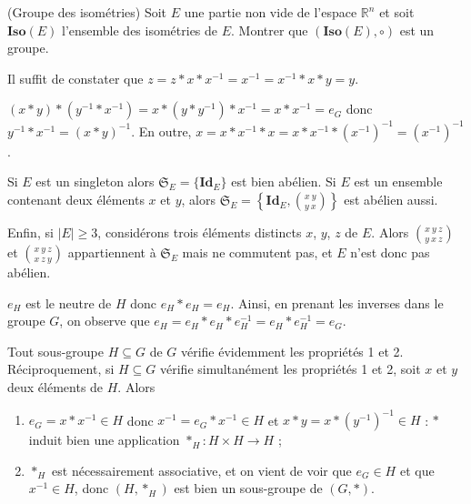 \begin{exo}(Groupe des isométries)
Soit $E$ une partie non vide de l'espace $\mathbb{R}^n$ et soit $\mathbf{Iso}(E)$ l'ensemble des isométries de $E$.
Montrer que $(\mathbf{Iso}(E), \circ)$ est un groupe.
\end{exo}

\begin{sol}
Il suffit de constater que $z = z \ast x \ast x^{-1} = x^{-1} = x^{-1} \ast x \ast y = y$.
\end{sol}

\begin{sol}
$(x \ast y) \ast (y^{-1} \ast x^{-1}) = x \ast (y \ast y^{-1}) \ast x^{-1} = x \ast x^{-1} = e_G$
donc $y^{-1} \ast x^{-1} = (x \ast y)^{-1}$.
En outre, $x = x \ast x^{-1} \ast x = x \ast x^{-1} \ast (x^{-1})^{-1} = (x^{-1})^{-1}$.
\end{sol}

\begin{sol}
Si $E$ est un singleton alors $\mathfrak{S}_E = \{\mathbf{Id}_E\}$ est bien abélien.
Si $E$ est un ensemble contenant deux éléments $x$ et $y$, alors
$\mathfrak{S}_E = \left\{\mathbf{Id}_E, \binom{x ~ y}{y ~ x} \right\}$ est abélien aussi.

Enfin, si $\vert E \vert \geq 3$, considérons trois éléments distincts $x$, $y$, $z$ de $E$.
Alors $\binom{x ~ y ~ z}{y ~ x ~ z}$ et $\binom{x ~ y ~ z}{x ~ z ~ y}$ appartiennent à $\mathfrak{S}_E$
mais ne commutent pas, et $E$ n'est donc pas abélien.
\end{sol}

\begin{sol}
$e_H$ est le neutre de $H$ donc $e_H \ast e_H = e_H$.
Ainsi, en prenant les inverses dans le groupe $G$,
on observe que $e_H = e_H \ast e_H \ast e_H^{-1} = e_H \ast e_H^{-1} = e_G$.
\end{sol}

\begin{sol}
Tout sous-groupe $H \subseteq G$ de $G$ vérifie évidemment les propriétés 1 et 2.
Réciproquement, si $H \subseteq G$ vérifie simultanément les propriétés 1 et 2,
soit $x$ et $y$ deux éléments de $H$.
Alors
\begin{enumerate}
\item $e_G = x \ast x^{-1} \in H$ donc $x^{-1} = e_G \ast x^{-1} \in H$ et $x \ast y = x \ast (y^{-1})^{-1} \in H$ :
$\ast$ induit bien une application $\ast_H : H \times H \to H$ ;
\item $\ast_H$ est nécessairement associative, et on vient de voir que $e_G \in H$ et que $x^{-1} \in H$, donc
$(H, \ast_H)$ est bien un sous-groupe de $(G, \ast)$.
\end{enumerate}
\end{sol}

